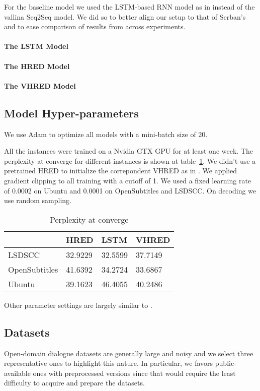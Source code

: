 \documentclass[runningheads]{llncs}
\begin{document}
For the baseline model we used the LSTM-based RNN model as in \cite{VHRED}
instead of the vallina Seq2Seq model.
We did so to better align our setup to that of Serban's and to ease comparison of
results from across experiments.

\paragraph{The LSTM Model}
\paragraph{The HRED Model}
\paragraph{The VHRED Model}

\subsection{Model Hyper-parameters}
We use Adam\cite{AdamOpt} to optimize all models with a mini-batch size of 20.

All the instances were trained on a Nvidia GTX GPU for at least one week.
The perplexity at converge for different instances is shown at
table~\ref{tab:converged_perplexity}.
We didn't use a pretrained HRED to initialize the correpondent VHRED as in \cite{VHRED}.
We applied gradient clipping to all training with a cutoff of 1.
We used a fixed learning rate of 0.0002 on Ubuntu and 0.0001 on OpenSubtitles and LSDSCC.
On decoding we use random sampling.

\begin{table}[H]
    \centering
    \caption{Perplexity at converge}
    \label{tab:converged_perplexity}
    \begin{tabular}{llll}
        \toprule
        \midrule
        & HRED & LSTM & VHRED \\
        \midrule
        LSDSCC & 32.9229 & 32.5599 & 37.7149 \\
        OpenSubtitles & 41.6392 & 34.2724 & 33.6867 \\
        Ubuntu & 39.1623 & 46.4055 & 40.2486 \\
        \bottomrule
    \end{tabular}
\end{table}

Other parameter settings are largely similar to \cite{VHRED}.

\subsection{Datasets}
Open-domain dialogue datasets are generally large and noisy and
we select three representative ones to highlight this nature.
In particular, we favors public-available ones with preprocessed versions
since that would require the least difficulty to acquire and prepare the datasets.
\end{document}
